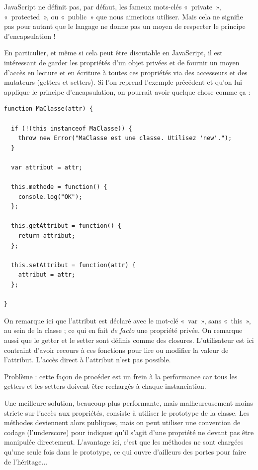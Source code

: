 \documentclass[a4paper,12pt]{article}
\begin{document}
JavaScript ne définit pas, par défaut, les fameux mots-clés «~private~», «~protected~», ou «~public~» que nous aimerions utiliser. Mais cela ne signifie pas pour autant que le langage ne donne pas un moyen de respecter le principe d'encapsulation !

En particulier, et même si cela peut être discutable en JavaScript, il est intéressant de garder les propriétés d'un objet privées et de fournir un moyen d'accès en lecture et en écriture à toutes ces propriétés via des accesseurs et des mutateurs (getters et setters). Si l'on reprend l'exemple précédent et qu'on lui applique le principe d'encapsulation, on pourrait avoir quelque chose comme ça :

\newpage

\begin{lstlisting}
function MaClasse(attr) {

  if (!(this instanceof MaClasse)) {
    throw new Error("MaClasse est une classe. Utilisez 'new'.");
  }

  var attribut = attr;
  
  this.methode = function() {
    console.log("OK");
  };
  
  this.getAttribut = function() {
    return attribut;
  };
  
  this.setAttribut = function(attr) {
    attribut = attr;
  };
  
}
\end{lstlisting}

On remarque ici que l'attribut est déclaré avec le mot-clé «~var~», sans «~this~», au sein de la classe ; ce qui en fait \textit{de facto} une propriété privée. On remarque aussi que le getter et le setter sont définis comme des closures. L'utilisateur est ici contraint d'avoir recours à ces fonctions pour lire ou modifier la valeur de l'attribut. L'accès direct à l'attribut n'est pas possible.

Problème : cette façon de procéder est un frein à la performance car tous les getters et les setters doivent être rechargés à chaque instanciation.

Une meilleure solution, beaucoup plus performante, mais malheureusement moins stricte sur l'accès aux propriétés, consiste à utiliser le prototype de la classe. Les méthodes deviennent alors publiques, mais on peut utiliser une convention de codage (l'underscore) pour indiquer qu'il s'agit d'une propriété ne devant pas être manipulée directement. L'avantage ici, c'est que les méthodes ne sont chargées qu'une seule fois dans le prototype, ce qui ouvre d'ailleurs des portes pour faire de l'héritage...
\end{document}
